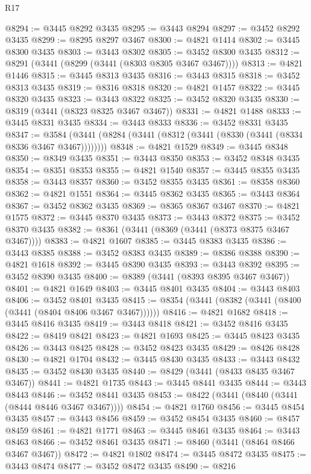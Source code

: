 \begin{lexlean}{R17}
\begin{coremodule}
@8294 := @3445 @8292 @3435
@8295 := @3443 @8294
@8297 := @3452 @8292 @3435
@8299 := @8295 @8297 @3467
@8300 := @4821 @1414
@8302 := @3445 @8300 @3435
@8303 := @3443 @8302
@8305 := @3452 @8300 @3435
@8312 := @8291 (@3441 (@8299 (@3441 (@8303 @8305 @3467 @3467))))
@8313 := @4821 @1446
@8315 := @3445 @8313 @3435
@8316 := @3443 @8315
@8318 := @3452 @8313 @3435
@8319 := @8316 @8318
@8320 := @4821 @1457
@8322 := @3445 @8320 @3435
@8323 := @3443 @8322
@8325 := @3452 @8320 @3435
@8330 := @8319 (@3441 (@8323 @8325 @3467 @3467))
@8331 := @4821 @1488
@8333 := @3445 @8331 @3435
@8334 := @3443 @8333
@8336 := @3452 @8331 @3435
@8347 := @3584 (@3441 (@8284 (@3441 (@8312 (@3441 (@8330 (@3441 (@8334 @8336 @3467 @3467))))))))
@8348 := @4821 @1529
@8349 := @3445 @8348
@8350 := @8349 @3435
@8351 := @3443 @8350
@8353 := @3452 @8348 @3435
@8354 := @8351 @8353
@8355 := @4821 @1540
@8357 := @3445 @8355 @3435
@8358 := @3443 @8357
@8360 := @3452 @8355 @3435
@8361 := @8358 @8360
@8362 := @4821 @1551
@8364 := @3445 @8362 @3435
@8365 := @3443 @8364
@8367 := @3452 @8362 @3435
@8369 := @8365 @8367 @3467
@8370 := @4821 @1575
@8372 := @3445 @8370 @3435
@8373 := @3443 @8372
@8375 := @3452 @8370 @3435
@8382 := @8361 (@3441 (@8369 (@3441 (@8373 @8375 @3467 @3467))))
@8383 := @4821 @1607
@8385 := @3445 @8383 @3435
@8386 := @3443 @8385
@8388 := @3452 @8383 @3435
@8389 := @8386 @8388
@8390 := @4821 @1618
@8392 := @3445 @8390 @3435
@8393 := @3443 @8392
@8395 := @3452 @8390 @3435
@8400 := @8389 (@3441 (@8393 @8395 @3467 @3467))
@8401 := @4821 @1649
@8403 := @3445 @8401 @3435
@8404 := @3443 @8403
@8406 := @3452 @8401 @3435
@8415 := @8354 (@3441 (@8382 (@3441 (@8400 (@3441 (@8404 @8406 @3467 @3467))))))
@8416 := @4821 @1682
@8418 := @3445 @8416 @3435
@8419 := @3443 @8418
@8421 := @3452 @8416 @3435
@8422 := @8419 @8421
@8423 := @4821 @1693
@8425 := @3445 @8423 @3435
@8426 := @3443 @8425
@8428 := @3452 @8423 @3435
@8429 := @8426 @8428
@8430 := @4821 @1704
@8432 := @3445 @8430 @3435
@8433 := @3443 @8432
@8435 := @3452 @8430 @3435
@8440 := @8429 (@3441 (@8433 @8435 @3467 @3467))
@8441 := @4821 @1735
@8443 := @3445 @8441 @3435
@8444 := @3443 @8443
@8446 := @3452 @8441 @3435
@8453 := @8422 (@3441 (@8440 (@3441 (@8444 @8446 @3467 @3467))))
@8454 := @4821 @1760
@8456 := @3445 @8454 @3435
@8457 := @3443 @8456
@8459 := @3452 @8454 @3435
@8460 := @8457 @8459
@8461 := @4821 @1771
@8463 := @3445 @8461 @3435
@8464 := @3443 @8463
@8466 := @3452 @8461 @3435
@8471 := @8460 (@3441 (@8464 @8466 @3467 @3467))
@8472 := @4821 @1802
@8474 := @3445 @8472 @3435
@8475 := @3443 @8474
@8477 := @3452 @8472 @3435
@8490 := @8216

\end{coremodule}
\end{lexlean}
